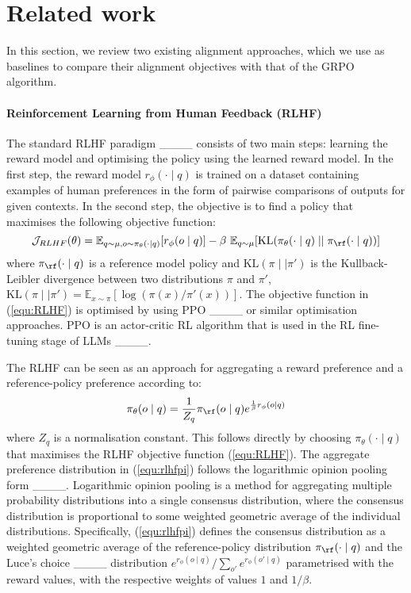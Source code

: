 \section{Related work}

In this section, we review two existing alignment approaches, which we use as baselines to compare their alignment objectives with that of the GRPO algorithm. 

\paragraph{Reinforcement Learning from Human Feedback (RLHF)} The standard RLHF paradigm ____ consists of two main steps: learning the reward model and optimising the policy using the learned reward model. In the first step, the reward model $r_\phi(\cdot\mid q)$ is trained on a dataset containing examples of human preferences in the form of pairwise comparisons of outputs for given contexts. In the second step, the objective is to find a policy that maximises the following objective function:
\begin{equation}
\mathcal{J}_{RLHF}(\theta) = \mathbb{E}_{q\sim \mu, o\sim \pi_\theta(\cdot\mid q)}[r_\phi(o\mid q)] - \beta\ \mathbb{E}_{q\sim \mu}[\mathrm{KL}(\pi_\theta(\cdot\mid q)\mid\mid \pi_{\rf}(\cdot \mid q))]
\label{equ:RLHF}
\end{equation}
where $\pi_\rf(\cdot\mid q)$ is a reference model policy and $\mathrm{KL}(\pi\mid\mid \pi')$ is the Kullback-Leibler divergence between two distributions $\pi$ and $\pi'$, $\mathrm{KL}(\pi\mid \mid \pi')=\mathbb{E}_{x\sim \pi}[\log(\pi(x)/\pi'(x))]$. The objective function in (\ref{equ:RLHF}) is optimised by using PPO ____ or similar optimisation approaches. PPO is an actor-critic RL algorithm that is used in the RL fine-tuning stage of LLMs ____.

The RLHF can be seen as an approach for aggregating a reward preference and a reference-policy preference according to:
\begin{equation}
\pi_\theta(o\mid q ) = \frac{1}{Z_q}\pi_{\rf}(o\mid q) e^{\frac{1}{\beta}r_\phi(o\mid q)}
\label{equ:rlhfpi}
\end{equation}
where $Z_q$ is a normalisation constant. This follows directly by choosing $\pi_\theta(\cdot\mid q)$ that maximises the RLHF objective function (\ref{equ:RLHF}). The aggregate preference distribution in (\ref{equ:rlhfpi}) follows the logarithmic opinion pooling form ____. Logarithmic opinion pooling is a method for aggregating multiple probability distributions into a single consensus distribution, where the consensus distribution is proportional to some weighted geometric average of the individual distributions. Specifically, (\ref{equ:rlhfpi}) defines the consensus distribution as a weighted geometric average of the reference-policy distribution $\pi_\rf(\cdot\mid q)$ and the Luce's choice ____ distribution $e^{r_\phi(o\mid q)}/\sum_{o'}e^{r_\phi(o'\mid q)}$ parametrised with the reward values, with the respective weights of values $1$ and $1/\beta$.  

